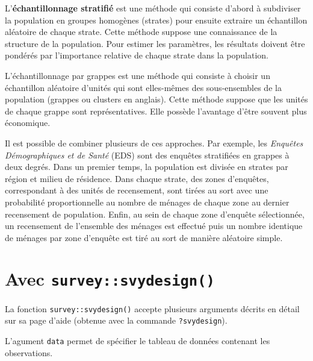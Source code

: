 \documentclass[
  letterpaper,
  DIV=11,
  numbers=noendperiod,
  oneside]{scrreprt}
\begin{document}
L'\textbf{échantillonnage stratifié} est une méthode qui consiste
d'abord à subdiviser la population en groupes homogènes (strates) pour
ensuite extraire un échantillon aléatoire de chaque strate. Cette
méthode suppose une connaissance de la structure de la population. Pour
estimer les paramètres, les résultats doivent être pondérés par
l'importance relative de chaque strate dans la population.

L'échantillonnage par grappes est une méthode qui consiste à choisir un
échantillon aléatoire d'unités qui sont elles-mêmes des sous-ensembles
de la population (grappes ou clusters en anglais). Cette méthode suppose
que les unités de chaque grappe sont représentatives. Elle possède
l'avantage d'être souvent plus économique.

Il est possible de combiner plusieurs de ces approches. Par exemple, les
\emph{Enquêtes Démographiques et de Santé} (EDS)
sont des enquêtes stratifiées en grappes à deux degrés. Dans un premier
temps, la population est divisée en strates par région et milieu de
résidence. Dans chaque strate, des zones d'enquêtes, correspondant à des
unités de recensement, sont tirées au sort avec une probabilité
proportionnelle au nombre de ménages de chaque zone au dernier
recensement de population. Enfin, au sein de chaque zone d'enquête
sélectionnée, un recensement de l'ensemble des ménages est effectué puis
un nombre identique de ménages par zone d'enquête est tiré au sort de
manière aléatoire simple.

\hypertarget{avec-surveysvydesign}{%
\section{\texorpdfstring{Avec
\texttt{survey::svydesign()}}{Avec survey::svydesign()}}\label{avec-surveysvydesign}}

La fonction \texttt{survey::svydesign()} accepte plusieurs arguments
décrits en détail sur sa page d'aide (obtenue avec la commande
\texttt{?svydesign}).

L'agument \texttt{data} permet de spécifier le tableau de données
contenant les observations.
\end{document}
